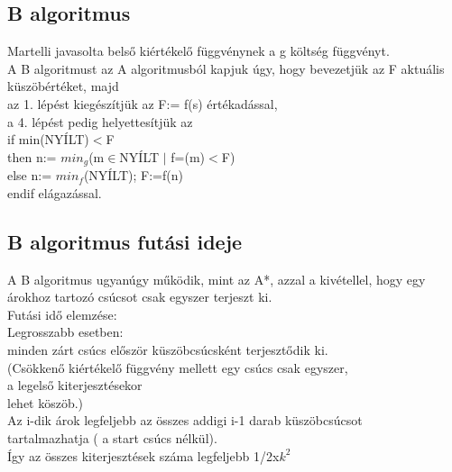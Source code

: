 \documentclass{article}
\begin{document}
	 \subsection{B algoritmus}
	 Martelli javasolta belső kiértékelő függvénynek a g költség függvényt.\\
	 A B algoritmust az A algoritmusból kapjuk úgy, hogy bevezetjük az F aktuális küszöbértéket, majd\\
	 \hspace*{1em} az 1. lépést kiegészítjük az F:= f(s) értékadással,\\
	 \hspace*{1em} a 4. lépést pedig helyettesítjük az \\
	 \hspace*{1em} if min(NYÍLT)$<$F\\
	 \hspace*{2em} then n:= $min_g$(m$\in$NYÍLT $|$ f=(m)$<$F)\\
	 \hspace*{2em} else n:= $min_f$(NYÍLT); F:=f(n)\\
	 \hspace*{1em} endif elágazással.
	 
	 \newpage
	 \subsection{B algoritmus futási ideje}
	 A B algoritmus ugyanúgy működik, mint az A*, azzal a kivétellel, hogy egy árokhoz tartozó csúcsot csak egyszer terjeszt ki.\\
	 Futási idő elemzése:\\
	 \hspace*{1em} Legrosszabb esetben:\\
	 \hspace*{2em} minden zárt csúcs először küszöbcsúcsként terjesztődik ki. \\
	 \hspace*{2em} (Csökkenő kiértékelő függvény mellett egy csúcs csak egyszer, \\
	 \hspace*{2em} a legelső kiterjesztésekor\\
	 \hspace*{2em} lehet köszöb.)\\
	 \hspace*{2em} Az i-dik árok legfeljebb az összes addigi i-1 darab küszöbcsúcsot \\
	 \hspace*{2em} tartalmazhatja ( a start csúcs nélkül).\\
	 \hspace*{1em} Így az összes kiterjesztések száma legfeljebb 1/2x$k^2$
	 
\end{document}
